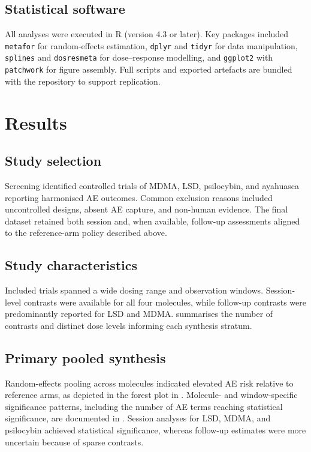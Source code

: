 \documentclass[11pt,a4paper]{article}
\begin{document}
\subsection{Statistical software}
All analyses were executed in R (version 4.3 or later). Key packages included \texttt{metafor} for random-effects estimation, \texttt{dplyr} and \texttt{tidyr} for data manipulation, \texttt{splines} and \texttt{dosresmeta} for dose--response modelling, and \texttt{ggplot2} with \texttt{patchwork} for figure assembly. Full scripts and exported artefacts are bundled with the repository to support replication.


\section{Results}
\subsection{Study selection}
Screening identified controlled trials of MDMA, LSD, psilocybin, and ayahuasca reporting harmonised AE outcomes. Common exclusion reasons included uncontrolled designs, absent AE capture, and non-human evidence. The final dataset retained both session and, when available, follow-up assessments aligned to the reference-arm policy described above.

\subsection{Study characteristics}
Included trials spanned a wide dosing range and observation windows. Session-level contrasts were available for all four molecules, while follow-up contrasts were predominantly reported for LSD and MDMA.  summarises the number of contrasts and distinct dose levels informing each synthesis stratum.

\subsection{Primary pooled synthesis}
Random-effects pooling across molecules indicated elevated AE risk relative to reference arms, as depicted in the forest plot in . Molecule- and window-specific significance patterns, including the number of AE terms reaching statistical significance, are documented in . Session analyses for LSD, MDMA, and psilocybin achieved statistical significance, whereas follow-up estimates were more uncertain because of sparse contrasts.
\end{document}
